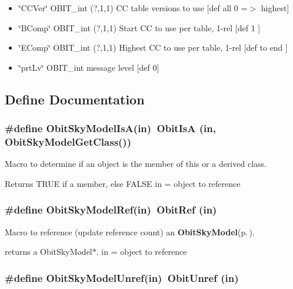 \begin{itemize}
[def all 0.0] \item \char`\"{}CCVer\char`\"{} OBIT\_\-int (?,1,1) CC table versions to use [def all 0 =$>$ highest] \item \char`\"{}BComp\char`\"{} OBIT\_\-int (?,1,1) Start CC to use per table, 1-rel [def 1 ] \item \char`\"{}EComp\char`\"{} OBIT\_\-int (?,1,1) Highest CC to use per table, 1-rel [def to end ] \item \char`\"{}prt\-Lv\char`\"{} OBIT\_\-int message level [def 0]\end{itemize}


\subsection{Define Documentation}
\subsubsection{\setlength{\rightskip}{0pt plus 5cm}\#define Obit\-Sky\-Model\-Is\-A(in)\ Obit\-Is\-A (in, Obit\-Sky\-Model\-Get\-Class())}\label{ObitSkyModel_8h_a2}


Macro to determine if an object is the member of this or a derived class. 

Returns TRUE if a member, else FALSE in = object to reference 
\subsubsection{\setlength{\rightskip}{0pt plus 5cm}\#define Obit\-Sky\-Model\-Ref(in)\ Obit\-Ref (in)}\label{ObitSkyModel_8h_a1}


Macro to reference (update reference count) an {\bf Obit\-Sky\-Model}{\rm (p.\,\pageref{structObitSkyModel})}. 

returns a Obit\-Sky\-Model$\ast$. in = object to reference 
\subsubsection{\setlength{\rightskip}{0pt plus 5cm}\#define Obit\-Sky\-Model\-Unref(in)\ Obit\-Unref (in)}\label{ObitSkyModel_8h_a0}


